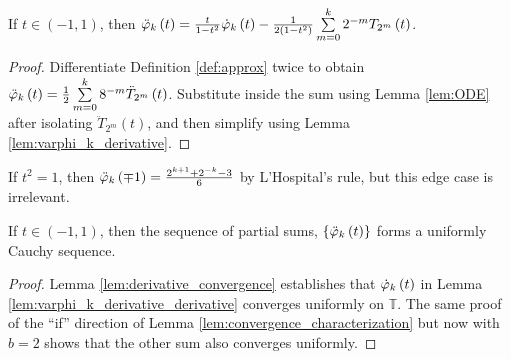 \begin{lemma}
  \label{lem:varphi_k_derivative_derivative}
  If $t \in \left(-1,1\right)$, then $\ddotvarphi[t]{k} = \frac{t}{1 - t^2} \dotvarphi[t]{k} - \frac{1}{2\left(1 - t^2\right)} \sum\limits_{m = 0}^k 2^{-m} \TT[t]{m}$.
\end{lemma}
\begin{proof}
  Differentiate Definition \ref{def:approx} twice to obtain $\ddotvarphi[t]{k} = \frac{1}{2} \sum\limits_{m = 0}^k 8^{-m} \ddot{T}_{2^m}\left(t\right)$. Substitute inside the sum using Lemma \ref{lem:ODE} after isolating $\ddot{T}_{2^m}\left(t\right)$, and then simplify using Lemma \ref{lem:varphi_k_derivative}.
 \end{proof}

\begin{remark*}
  If $t^2 = 1$, then $\ddotvarphi[\mp 1]{k} = \frac{2^{k + 1} + 2^{-k} - 3}{6}$ by L'Hospital's rule, but this edge case is irrelevant.
\end{remark*}

\begin{lemma}
  \label{lem:more_convergence}
  If $t \in \left(-1,1\right)$, then the sequence of partial sums, $\{\ddotvarphi[t]{k}\}$ forms a uniformly Cauchy sequence.
\end{lemma}
\begin{proof}
  Lemma \ref{lem:derivative_convergence} establishes that $\dotvarphi[t]{k}$ in Lemma \ref{lem:varphi_k_derivative_derivative} converges uniformly on $\mathbb{T}$. The same proof of the ``if'' direction of Lemma \ref{lem:convergence_characterization} but now with $b = 2$ shows that the other sum also converges uniformly.
\end{proof}

